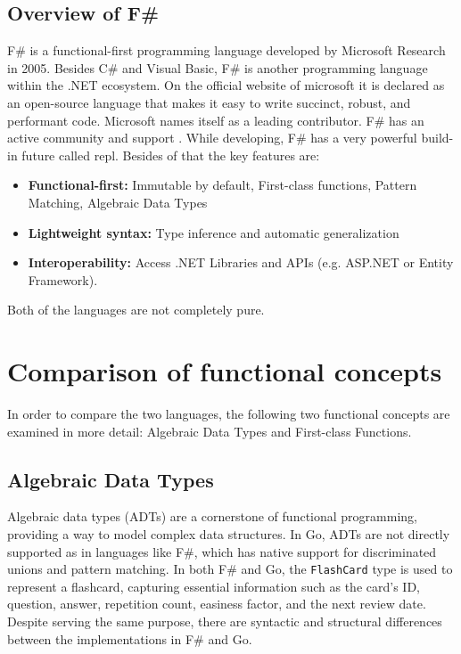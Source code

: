     \section{Overview of F\#}\label{sec:fsharp-overview}
    F\# is a functional-first programming language developed by Microsoft Research in 2005.
    Besides C\# and Visual Basic, F\# is another programming language within the .NET ecosystem. On the official website of microsoft it is declared as an open-source language that makes it easy to write succinct, robust, and performant code. Microsoft names itself as a leading contributor. F\# has an active community and support \cite{fsharpfoundation}.
    While developing, F\# has a very powerful build-in future called \ac{repl}. Besides of that the key features are:
    \begin{itemize}
        \item \textbf{Functional-first:} Immutable by default, First-class functions, Pattern Matching, Algebraic Data Types 
        \item \textbf{Lightweight syntax:} Type inference and automatic generalization
        \item \textbf{Interoperability:} Access .NET Libraries and APIs (e.g. ASP.NET or Entity Framework). 
    \end{itemize}
    \cite{dotnet}
    \cite{keyfeaturesfsharp}
    Both of the languages are not completely pure.


\chapter{Comparison of functional concepts}\label{chap:comparison}
In order to compare the two languages, the following two functional concepts are examined in more detail: Algebraic Data Types and First-class Functions. 

    \section{Algebraic Data Types}\label{sec:algebraic-data-types}

    Algebraic data types (ADTs) are a cornerstone of functional programming, providing a way to model complex data structures. In Go, ADTs are not directly supported as in languages like F\#, which has native support for discriminated unions and pattern matching. In both F\# and Go, the \texttt{FlashCard} type is used to represent a flashcard, capturing essential information such as the card's ID, question, answer, repetition count, easiness factor, and the next review date. Despite serving the same purpose, there are syntactic and structural differences between the implementations in F\# and Go.


